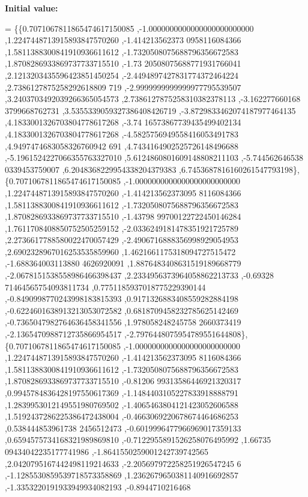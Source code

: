 {\bfseries Initial value\+:}
\begin{DoxyCode}
= \{\{0.7071067811865474617150085 ,-1.0000000000000000000000000 ,1.2247448713915893847570260 ,-1.414213562373
      0958116084366 ,1.5811388300841910936611612 ,-1.7320508075688796356672583 ,1.8708286933869737733715510 ,-1.73
      20508075688771931766041 ,2.1213203435596423851450254 ,-2.4494897427831774372464224 ,2.7386127875258292618809
      719 ,-2.9999999999999977795539507 ,3.2403703492039266365054573 ,2.7386127875258310382378113 ,-3.162277660168
      3799668762731 ,3.5355339059327386408426719 ,-3.8729833462074187977464135 ,4.1833001326703804778617268 ,-3.74
      16573867739435499402134 ,4.1833001326703804778617268 ,-4.5825756949558416053491783 ,4.9497474683058326760942
      691 ,4.7434164902525726148496688 ,-5.1961524227066355763327010 ,5.6124860801609148808211103 ,-5.744562646538
      0339453759007 ,6.2048368229954338204379383 ,6.7453687816160261547793198\},
\{0.7071067811865474617150085 ,-1.0000000000000000000000000 ,1.2247448713915893847570260 ,-1.414213562373095
      8116084366 ,1.5811388300841910936611612 ,-1.7320508075688796356672583 ,1.8708286933869737733715510 ,-1.43798
      99700122722450146284 ,1.7611708408850752505259152 ,-2.0336249181478351921725789 ,2.2736617788580022470057429
       ,-2.4906716888356998929054953 ,2.6902328967016253535859960 ,1.4621661175318094727515472 ,-1.688364003113880
      4626920091 ,1.8876483408631519189668779 ,-2.0678151538558986466398437 ,2.2334956373964058862213733 ,-0.69328
      71464565754093811734 ,0.7751185937018775229390144 ,-0.8490998770243998183815393 ,0.9171326883408559282884198
       ,-0.6224601638913213053072582 ,0.6818709458232785625142469 ,-0.7365047982764636458341556 ,1.978058248245758
      2660373419 ,-2.1365470988712735866954517 ,-2.7976448075954789551644808\},
\{0.7071067811865474617150085 ,-1.0000000000000000000000000 ,1.2247448713915893847570260 ,-1.414213562373095
      8116084366 ,1.5811388300841910936611612 ,-1.7320508075688796356672583 ,1.8708286933869737733715510 ,-0.81206
      99313586446921320317 ,0.9945784836428197550617369 ,-1.1484403105227833918888791 ,1.2839953012149551980769502
       ,-1.4065463804121423052606588 ,1.5192437286225386472438004 ,-0.4663069220678674464686253 ,0.538444853961738
      2456512473 ,-0.6019996477966969017359133 ,0.6594575734168321989869810 ,-0.7122955891526258076495992 ,1.66735
      09434042235177741986 ,-1.8641550259001242739742565 ,2.0420795167442498119214633 ,-2.205697972258251926547245
      6 ,-1.1285530859539718573358869 ,1.2362679650381140916692857 ,-1.3353220191933949934082193 ,-0.8944710216468

\end{DoxyCode}

